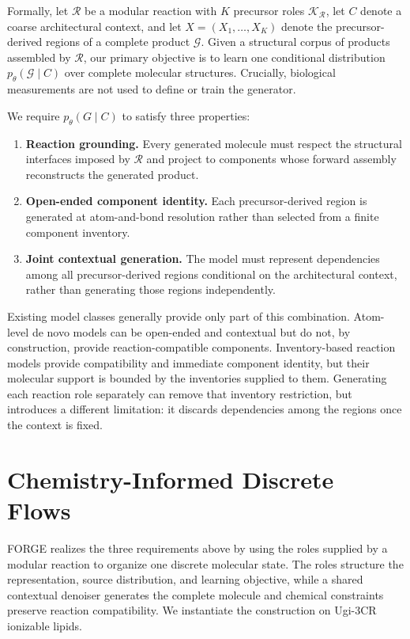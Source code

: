 \documentclass{article}
\begin{document}
Formally, let $\mathcal{R}$ be a modular reaction with $K$ precursor roles
$\mathcal{K}_{\mathcal{R}}$, let $C$ denote a coarse architectural context, and let
$X=(X_1,\ldots,X_K)$ denote the precursor-derived regions of a complete product $\mathcal{G}$. Given a
structural corpus of products assembled by $\mathcal{R}$, our primary objective is to
learn one conditional distribution $p_\theta(\mathcal{G}\mid C)$ over complete molecular structures. Crucially, biological measurements are not
used to define or train the generator.

We require $p_\theta(G\mid C)$ to satisfy three properties:
\begin{enumerate}
\setlength{\itemsep}{0pt}
\item \textbf{Reaction grounding.} Every generated molecule must respect the structural interfaces
imposed by $\mathcal{R}$ and project to components whose forward assembly reconstructs the generated
product.
\item \textbf{Open-ended component identity.} Each precursor-derived region is generated at
atom-and-bond resolution rather than selected from a finite component inventory.
\item \textbf{Joint contextual generation.} The model must represent dependencies among all
precursor-derived regions conditional on the architectural context, rather than generating those
regions independently.
\end{enumerate}

Existing model classes generally provide only part of this combination. Atom-level de novo models
can be open-ended and contextual but do not, by construction, provide reaction-compatible components.
Inventory-based reaction models provide compatibility and immediate component identity, but their
molecular support is bounded by the inventories supplied to them. Generating each reaction role
separately can remove that inventory restriction, but introduces a different limitation: it discards
dependencies among the regions once the context is fixed.

\section{Chemistry-Informed Discrete Flows}
\label{sec:model}

FORGE realizes the three requirements above by using the roles supplied by a modular reaction to
organize one discrete molecular state. The roles structure the representation, source distribution,
and learning objective, while a shared contextual denoiser generates the complete molecule and
chemical constraints preserve reaction compatibility. We instantiate the construction on Ugi-3CR
ionizable lipids.
\end{document}
